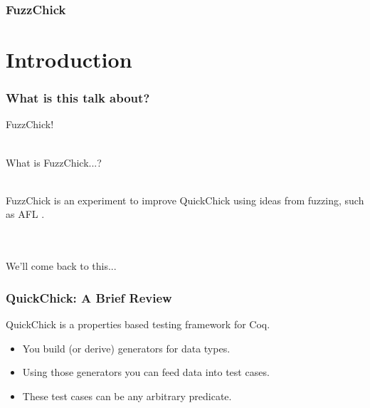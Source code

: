 \documentclass{beamer}
\author{
  Beck, Calvin \and Huang, Jiani \and Li, Yishuai
}
\begin{document}
\begin{frame}
  \frametitle{FuzzChick}
  \maketitle
\end{frame}

\section{Introduction}

\begin{frame}
  \frametitle{What is this talk about?}

  \pause

  {\huge FuzzChick!}\\~\\

  \pause

  What is FuzzChick...? \\~\\

  \pause

  FuzzChick is an experiment to improve QuickChick using ideas from
  fuzzing, such as AFL \cite{AFL}.\\~\\~\\

  \pause

  {\huge We'll come back to this...}\\

\end{frame}

\begin{frame}
  \frametitle{QuickChick: A Brief Review}

  QuickChick is a properties based testing framework for Coq. \\

  \begin{itemize}
  \item You build (or derive) generators for data types.
  \item Using those generators you can feed data into test cases.
  \item These test cases can be any arbitrary predicate.
  \end{itemize}
\end{frame}
\end{document}
